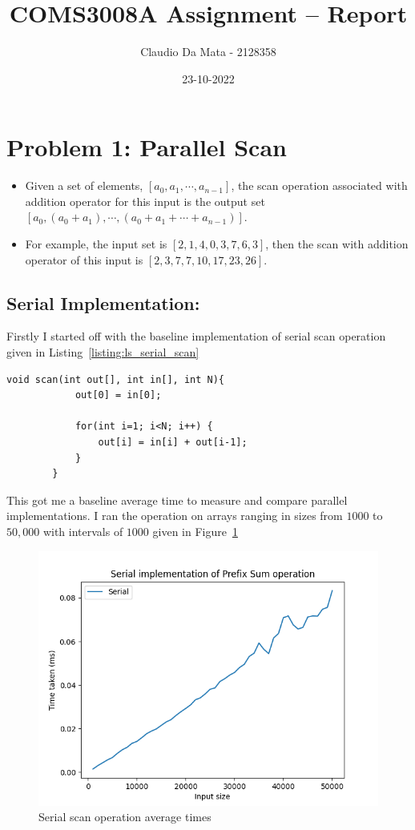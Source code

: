 

	\title{COMS3008A Assignment -- Report}
	\author{Claudio Da Mata - 2128358}
	\date{23-10-2022} 
	\maketitle 
	\pagestyle{fancy}
	\fancyhf{}
	\fancyhead[R]{\thepage}
	\graphicspath{ {./pics/} }
	
	
	\section{Problem 1: Parallel Scan}
	\begin{itemize}
		\item  Given a set of elements, $[a_0,a_1,\dotsm,a_{n-1}]$, the scan operation associated with addition operator for this input is the output set $[a_0,(a_0+a_1),\dotsm,(a_0+a_1+\dotsm+a_{n-1})]$. 
		\item For example, the input set is $[2,1,4,0,3,7,6,3]$, then the scan with addition operator of this input is $[2,3,7,7,10,17,23,26]$. 
	\end{itemize}
	\subsection{Serial Implementation:}
	Firstly I started off with the baseline implementation of serial scan operation given in Listing~\ref{listing:ls_serial_scan}
	\begin{lstlisting}[caption={Sequential algorithm for computing scan operation with ‘+’ operator\cite{PrefixSumArray}.}, label={listing:ls_serial_scan}]
		void scan(int out[], int in[], int N){
			out[0] = in[0];
			
			for(int i=1; i<N; i++) {
				out[i] = in[i] + out[i-1];
			}
		}
	\end{lstlisting}
	
	This got me a baseline average time to measure and compare parallel implementations. I ran the operation on arrays ranging in sizes from $1000$ to $50,000$ with intervals of $1000$ given in Figure~\ref{fig:fig_serial_scan}
	\begin{figure}[!htb]
		\centering
		\includegraphics[width=0.6\linewidth]{serial_scan.png}
		\caption{Serial scan operation average times}
		\label{fig:fig_serial_scan}
	\end{figure}
	

